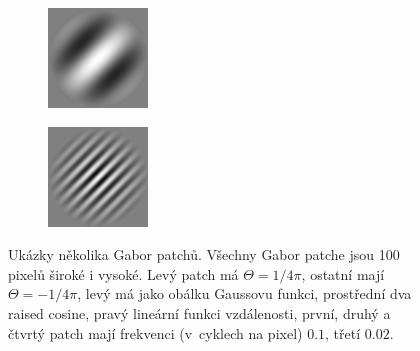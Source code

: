 \begin{figure}[h!]
\begin{subfigure}{0.25\textwidth}
  \includegraphics[width=.8\linewidth]{img/gabor3}
\end{subfigure}%
\begin{subfigure}{0.25\textwidth}
  \centering
  \includegraphics[width=.8\linewidth]{img/gabor4}
\end{subfigure}%

\caption{Ukázky několika Gabor patchů. Všechny Gabor patche jsou 100 pixelů
široké i vysoké. Levý patch má $\Theta = 1/4\pi$, ostatní mají $\Theta =
-1/4\pi$, levý má jako obálku Gaussovu funkci, prostřední dva raised cosine,
pravý lineární funkci vzdálenosti, první, druhý a čtvrtý patch mají frekvenci
(v~cyklech na pixel) $0.1$, třetí $0.02$.} 

\label{obr:gabor:example} 
 
\end{figure}


